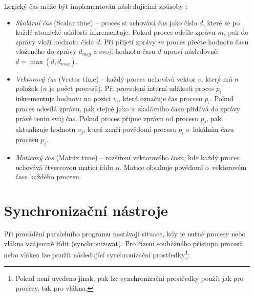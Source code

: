 
Logický čas může být implementován následujícími způsoby \cite{cite:PDI}:
\begin{itemize}
\item \textit{Skalární čas} (Scalar time) -- proces si uchovává čas jako číslo $d$, které se po každé atomické události inkrementuje. Pokud proces odešle zprávu $m$, pak do zprávy vloží hodnotu čísla $d$. Při přijetí zprávy $m$ proces přečte hodnotu času vloženého do zprávy $d_{msg}$ a svoji hodnotu času $d$ upraví následovně: $d = \max(d, d_{msg})$.

\item \textit{Vektorový čas} (Vector time) -- každý proces uchovává vektor $v$, který má $n$ položek ($n$ je počet procesů). Při provedení interní události proces $p_i$ inkrementuje hodnotu na pozici $v_i$, která označuje čas procesu $p_i$. Pokud proces odesílá zprávu, pak stejně jako u~skalárního času přidává do zprávy právě tento svůj čas. Pokud proces přijme zprávu od procesu $p_j$, pak aktualizuje hodnotu $v_j$, která značí povědomí procesu $p_i$ o~lokálním času procesu $p_j$.

\item \textit{Maticový čas} (Matrix time) -- rozšíření vektorového času, kde každý proces uchovává čtvercovou matici řádu $n$. Matice obsahuje povědomí o~vektorovém čase každého procesu.  
\end{itemize}

\section{Synchronizační nástroje}
Při provádění paralelního programu nastávají situace, kdy je nutné procesy nebo vlákna vzájemně řídit (synchronizovat). Pro řízení souběžného přístupu procesů nebo vláken lze použít následující synchronizační prostředky\footnote{Pokud není uvedeno jinak, pak lze synchronizační prostředky použít jak pro procesy, tak pro vlákna.}:

